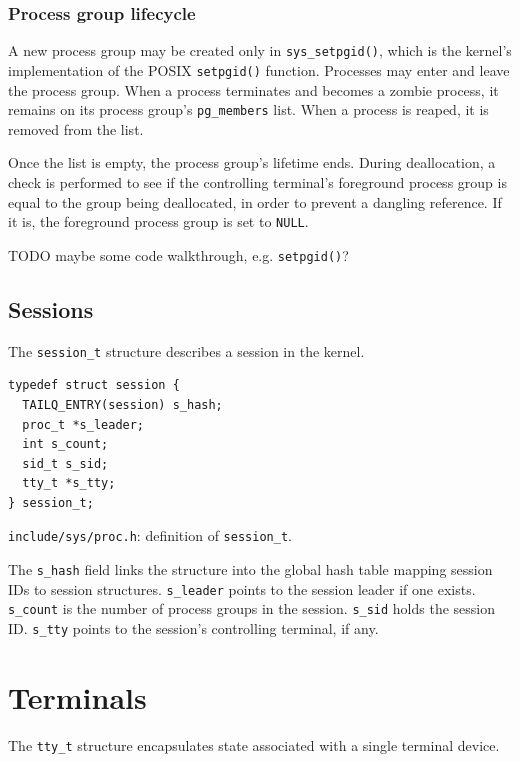 \documentclass[shortabstract, manyadvisors, english, mgr]{iithesis}
\begin{document}
\subsubsection{Process group lifecycle}

A new process group may be created only in \texttt{sys\_setpgid()}, which is the
kernel's implementation of the POSIX \texttt{setpgid()} function. Processes may
enter and leave the process group. When a process terminates and becomes a
zombie process, it remains on its process group's \texttt{pg\_members} list.
When a process is reaped, it is removed from the list.

Once the list is empty, the process group's lifetime ends. During deallocation,
a check is performed to see if the controlling terminal's foreground process
group is equal to the group being deallocated, in order to prevent a dangling
reference. If it is, the foreground process group is set to \texttt{NULL}.

TODO maybe some code walkthrough, e.g. \texttt{setpgid()}?

\subsection{Sessions}\label{chapter:sessions}

The \texttt{session\_t} structure describes a session in the kernel.

\begin{listing}[H]
\begin{verbatim}
typedef struct session {
  TAILQ_ENTRY(session) s_hash;
  proc_t *s_leader;
  int s_count;
  sid_t s_sid;
  tty_t *s_tty;
} session_t;
\end{verbatim}
\caption{\texttt{include/sys/proc.h}: definition of \texttt{session\_t}.}
\end{listing}
The \texttt{s\_hash} field links the structure into the global hash table
mapping session IDs to session structures. \texttt{s\_leader} points to the
session leader if one exists. \texttt{s\_count} is the number of process groups
in the session. \texttt{s\_sid} holds the session ID. \texttt{s\_tty} points to
the session's controlling terminal, if any.

\section{Terminals}

The \texttt{tty\_t} structure encapsulates state associated with a single
terminal device.
\end{document}
